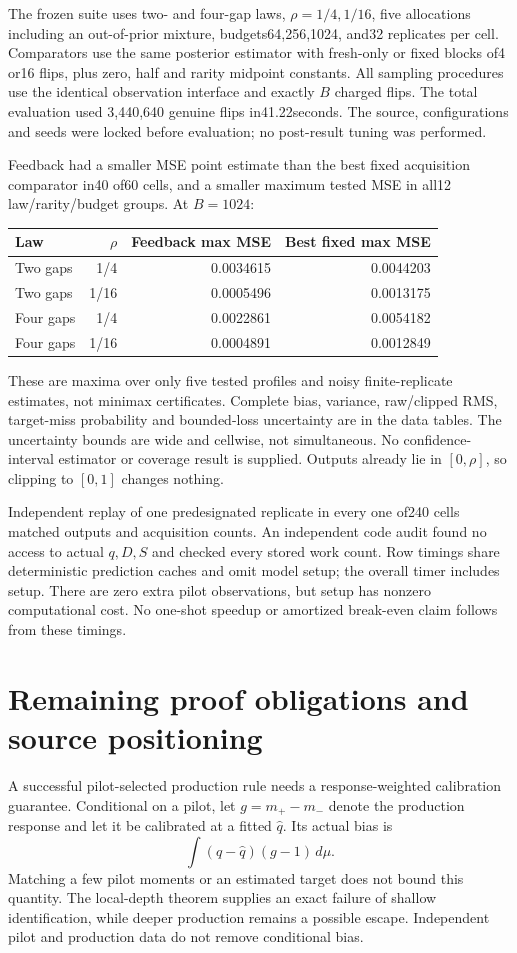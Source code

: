 \documentclass[11pt]{article}
\begin{document}
The frozen suite uses two- and four-gap laws, $\rho=1/4,1/16$, five
allocations including an out-of-prior mixture, budgets64,256,1024,
and32 replicates per cell. Comparators use the same posterior estimator
with fresh-only or fixed blocks of4 or16 flips, plus zero, half and rarity
midpoint constants. All sampling procedures use the identical observation
interface and exactly $B$ charged flips. The total evaluation used
3,440,640 genuine flips in41.22seconds. The source, configurations and seeds
were locked before evaluation; no post-result tuning was performed.

Feedback had a smaller MSE point estimate than the best fixed acquisition
comparator in40 of60 cells, and a smaller maximum tested MSE in all12
law/rarity/budget groups. At $B=1024$:
\begin{center}
\begin{tabular}{lrrr}
Law & $\rho$ & Feedback max MSE & Best fixed max MSE\\\hline
Two gaps & 1/4 & 0.0034615 & 0.0044203\\
Two gaps & 1/16 & 0.0005496 & 0.0013175\\
Four gaps & 1/4 & 0.0022861 & 0.0054182\\
Four gaps & 1/16 & 0.0004891 & 0.0012849
\end{tabular}
\end{center}
These are maxima over only five tested profiles and noisy finite-replicate
estimates, not minimax certificates. Complete bias, variance, raw/clipped
RMS, target-miss probability and bounded-loss uncertainty are in the data
tables. The uncertainty bounds are wide and cellwise, not simultaneous.
No confidence-interval estimator or coverage result is supplied. Outputs
already lie in $[0,\rho]$, so clipping to $[0,1]$ changes nothing.

Independent replay of one predesignated replicate in every one of240 cells
matched outputs and acquisition counts. An independent code audit found no
access to actual $q,D,S$ and checked every stored work count. Row timings
share deterministic prediction caches and omit model setup; the overall
timer includes setup. There are zero extra pilot observations, but setup
has nonzero computational cost. No one-shot speedup or amortized break-even
claim follows from these timings.

\section{Remaining proof obligations and source positioning}
A successful pilot-selected production rule needs a response-weighted
calibration guarantee. Conditional on a pilot, let $g=m_+-m_-$ denote the
production response and let it be calibrated at a fitted $\widehat q$.
Its actual bias is
\[
 \int(q-\widehat q)(g-1)\,d\mu.
\]
Matching a few pilot moments or an estimated target does not bound this
quantity. The local-depth theorem supplies an exact failure of shallow
identification, while deeper production remains a possible escape.
Independent pilot and production data do not remove conditional bias.
\end{document}
